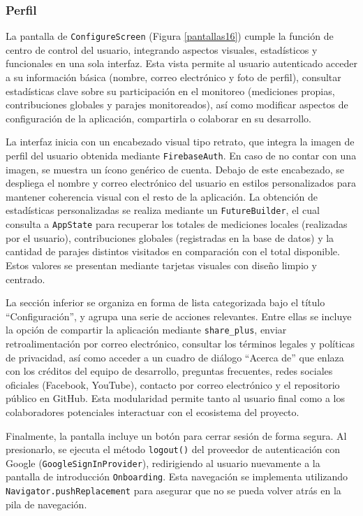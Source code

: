 \newpage
\subsubsection*{Perfil} 

La pantalla de \texttt{ConfigureScreen} (Figura \ref{pantallas16}) cumple la función de centro de control del usuario, integrando aspectos visuales, estadísticos y funcionales en una sola interfaz. Esta vista permite al usuario autenticado acceder a su información básica (nombre, correo electrónico y foto de perfil), consultar estadísticas clave sobre su participación en el monitoreo (mediciones propias, contribuciones globales y parajes monitoreados), así como modificar aspectos de configuración de la aplicación, compartirla o colaborar en su desarrollo.

La interfaz inicia con un encabezado visual tipo retrato, que integra la imagen de perfil del usuario obtenida mediante \texttt{FirebaseAuth}. En caso de no contar con una imagen, se muestra un ícono genérico de cuenta. Debajo de este encabezado, se despliega el nombre y correo electrónico del usuario en estilos personalizados para mantener coherencia visual con el resto de la aplicación. La obtención de estadísticas personalizadas se realiza mediante un \texttt{FutureBuilder}, el cual consulta a \texttt{AppState} para recuperar los totales de mediciones locales (realizadas por el usuario), contribuciones globales (registradas en la base de datos) y la cantidad de parajes distintos visitados en comparación con el total disponible. Estos valores se presentan mediante tarjetas visuales con diseño limpio y centrado.

La sección inferior se organiza en forma de lista categorizada bajo el título ``Configuración'', y agrupa una serie de acciones relevantes. Entre ellas se incluye la opción de compartir la aplicación mediante \texttt{share\_plus}, enviar retroalimentación por correo electrónico, consultar los términos legales y políticas de privacidad, así como acceder a un cuadro de diálogo “Acerca de” que enlaza con los créditos del equipo de desarrollo, preguntas frecuentes, redes sociales oficiales (Facebook, YouTube), contacto por correo electrónico y el repositorio público en GitHub. Esta modularidad permite tanto al usuario final como a los colaboradores potenciales interactuar con el ecosistema del proyecto.

Finalmente, la pantalla incluye un botón para cerrar sesión de forma segura. Al presionarlo, se ejecuta el método \texttt{logout()} del proveedor de autenticación con Google (\texttt{GoogleSignInProvider}), redirigiendo al usuario nuevamente a la pantalla de introducción \texttt{Onboarding}. Esta navegación se implementa utilizando \texttt{Navigator.pushReplacement} para asegurar que no se pueda volver atrás en la pila de navegación.

